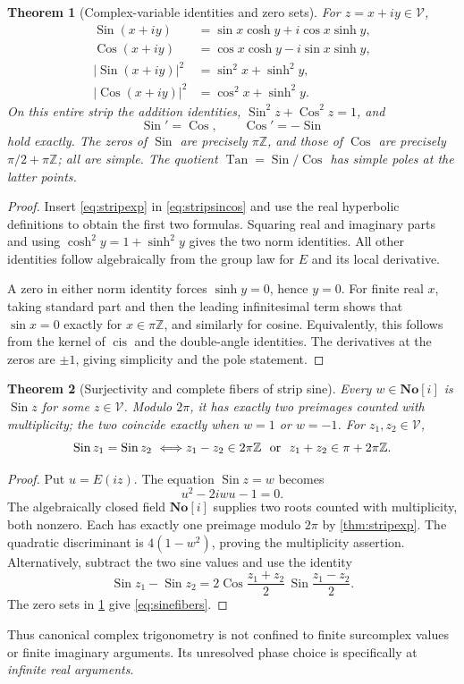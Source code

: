 \documentclass[11pt]{article}
\numberwithin{equation}{section}
\newtheorem{theorem}{Theorem}[section]
\theoremstyle{definition}
\newcommand{\SC}{\mathbf{No}[i]}
\newcommand{\Z}{\mathbb Z}
\newcommand{\cis}{\operatorname{cis}}
\newcommand{\Sin}{\operatorname{Sin}}
\newcommand{\Cos}{\operatorname{Cos}}
\newcommand{\Tan}{\operatorname{Tan}}
\begin{document}
\begin{theorem}[Complex-variable identities and zero sets]\label{thm:striptrig}
For $z=x+iy\in\mathscr V$,
\begin{align}
 \Sin(x+iy)&=\sin x\cosh y+i\cos x\sinh y,\\
 \Cos(x+iy)&=\cos x\cosh y-i\sin x\sinh y,\\
 |\Sin(x+iy)|^2&=\sin^2x+\sinh^2y,\\
 |\Cos(x+iy)|^2&=\cos^2x+\sinh^2y.
 \label{eq:stripmoduli}
\end{align}
On this entire strip the addition identities, $\Sin^2z+\Cos^2z=1$, and
\[
 \Sin'=\Cos,\qquad\Cos'=-\Sin
\]
hold exactly. The zeros of $\Sin$ are precisely $\pi\Z$, and those of $\Cos$ are precisely $\pi/2+\pi\Z$; all are simple. The quotient $\Tan=\Sin/\Cos$ has simple poles at the latter points.
\end{theorem}
\begin{proof}
Insert \eqref{eq:stripexp} in \eqref{eq:stripsincos} and use the real hyperbolic definitions to obtain the first two formulas. Squaring real and imaginary parts and using $\cosh^2y=1+\sinh^2y$ gives the two norm identities. All other identities follow algebraically from the group law for $E$ and its local derivative.

A zero in either norm identity forces $\sinh y=0$, hence $y=0$. For finite real $x$, taking standard part and then the leading infinitesimal term shows that $\sin x=0$ exactly for $x\in\pi\Z$, and similarly for cosine. Equivalently, this follows from the kernel of $\cis$ and the double-angle identities. The derivatives at the zeros are $\pm1$, giving simplicity and the pole statement.
\end{proof}

\begin{theorem}[Surjectivity and complete fibers of strip sine]\label{thm:sinefibers}
Every $w\in\SC$ is $\Sin z$ for some $z\in\mathscr V$. Modulo $2\pi$, it has exactly two preimages counted with multiplicity; the two coincide exactly when $w=1$ or $w=-1$. For $z_1,z_2\in\mathscr V$,
\begin{equation}\label{eq:sinefibers}
 \Sin z_1=\Sin z_2
 \ \Longleftrightarrow\\
 z_1-z_2\in2\pi\Z\ \text{ or }\ z_1+z_2\in\pi+2\pi\Z.
\end{equation}
\end{theorem}
\begin{proof}
Put $u=E(iz)$. The equation $\Sin z=w$ becomes
\[
 u^2-2iwu-1=0.
\]
The algebraically closed field $\SC$ supplies two roots counted with multiplicity, both nonzero. Each has exactly one preimage modulo $2\pi$ by \cref{thm:stripexp}. The quadratic discriminant is $4(1-w^2)$, proving the multiplicity assertion. Alternatively, subtract the two sine values and use the identity
\[
 \Sin z_1-\Sin z_2
 =2\Cos\frac{z_1+z_2}{2}\,\Sin\frac{z_1-z_2}{2}.
\]
The zero sets in \cref{thm:striptrig} give \eqref{eq:sinefibers}.
\end{proof}
Thus canonical complex trigonometry is not confined to finite surcomplex values or finite imaginary arguments. Its unresolved phase choice is specifically at \emph{infinite real arguments}.
\end{document}
